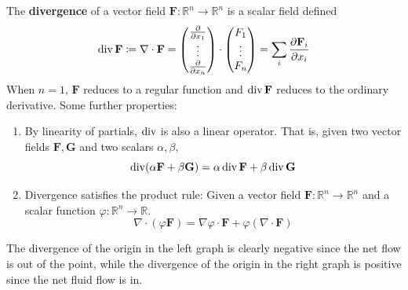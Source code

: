   \begin{definition}[Divergence]
  The \textbf{divergence} of a vector field $\mathbf{F}: \mathbb{R}^n \longrightarrow \mathbb{R}^n$ is a scalar field defined 
  \[\Div \mathbf{F} \coloneqq \nabla \cdot \mathbf{F} = \begin{pmatrix} \frac{\partial}{\partial x_1} \\ \vdots \\ \frac{\partial}{\partial x_n} \end{pmatrix} \cdot \begin{pmatrix} F_1 \\ \vdots \\ F_n \end{pmatrix} = \sum_i \frac{\partial \mathbf{F}_i}{\partial x_i}\]
  When $n = 1$, $\mathbf{F}$ reduces to a regular function and $\Div \mathbf{F} $ reduces to the ordinary derivative. Some further properties: 
  \begin{enumerate}
      \item By linearity of partials, $\Div$ is also a linear operator. That is, given two vector fields $\mathbf{F}, \mathbf{G}$ and two scalars $\alpha, \beta$, 
      \[\Div (\alpha \mathbf{F} + \beta \mathbf{G}) = \alpha \Div \mathbf{F} + \beta \Div \mathbf{G}\]
      
      \item Divergence satisfies the product rule: Given a vector field $\mathbf{F}: \mathbb{R}^n \longrightarrow \mathbb{R}^n$ and a scalar function $\varphi: \mathbb{R}^n \longrightarrow \mathbb{R}$. 
      \[\nabla \cdot (\varphi \mathbf{F}) = \nabla \varphi \cdot \mathbf{F} + \varphi (\nabla \cdot \mathbf{F})\]
  \end{enumerate}
  \end{definition}

  \begin{example}
  The divergence of the origin in the left graph is clearly negative since the net flow is out of the point, while the divergence of the origin in the right graph is positive since the net fluid flow is in. 
  \begin{center}
  \pgfplotsset{width=7cm,compat=1.16}
  \end{center}
  \end{example}

